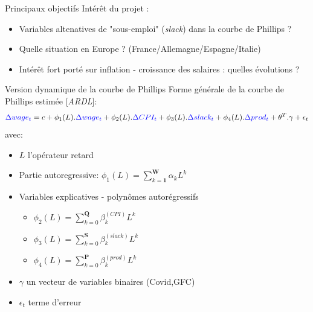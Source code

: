 \documentclass[9pt, xcolor={dvipsnames}]{beamer}
\newcommand{\blue}[1]{\textcolor{blue}{#1}}
\begin{document}
\begin{frame}{Principaux objectifs}
  Intérêt du projet :
  \begin{itemize}
    \item Variables altenatives de "sous-emploi" (\textit{slack}) dans la courbe de Phillips ?
    \item Quelle situation en Europe ? (France/Allemagne/Espagne/Italie)
    \item Intérêt fort porté sur inflation - croissance des salaires : quelles évolutions ?
  \end{itemize}
\end{frame}

\begin{frame}[label=model]{Version dynamique de la courbe de Phillips}
  Forme générale de la courbe de Phillips estimée [\textit{ARDL}]:
  \begin{equation*}
    \blue{\Delta wage_{t}} = c + \phi_{1}(L).\blue{\Delta wage_{t}} + \phi_{2}(L).\blue{\Delta CPI_{t}} + \phi_{3}(L).\blue{\Delta slack_{t}} + \phi_{4}(L).\blue{\Delta prod_{t}} + \theta^{T}.\gamma + \epsilon_{t}
  \end{equation*}
  avec:
  \begin{itemize}
    \item $L$ l'opérateur retard
    \item Partie autoregressive: $\phi_{1}(L) = \sum_{k=\mathbf{1}}^{\mathbf{W}}\alpha_k L^{k}$ 
    \item Variables explicatives - polynômes autorégressifs
    \begin{itemize}
      \item $\phi_{2}(L) = \sum_{k=0}^{\mathbf{Q}}\beta_k^{(CPI)} L^{k}$
      \item $\phi_{3}(L) = \sum_{k=0}^{\mathbf{S}}\beta_k^{(slack)} L^{k}$
      \item $\phi_{4}(L) = \sum_{k=0}^{\mathbf{P}}\beta_k^{(prod)} L^{k}$
    \end{itemize}
    \item $\gamma$ un vecteur de variables binaires (Covid,GFC)
    \item $\epsilon_{t}$ terme d'erreur
  \end{itemize}
\end{frame}
\end{document}
